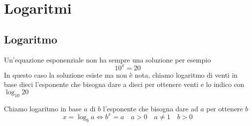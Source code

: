 \chapter{Logaritmi}
\label{sec:Logaritmi}
\minitoc
\mtcskip                                %
\minilof                                %
\mtcskip                                %
\minilot
\section{Logaritmo}
\label{sec:Lograritmo}
Un'equazione esponenziale non ha sempre una soluzione per esempio \[10^x=20\] In questo caso la soluzione esiste ma non è nota, chiamo logaritmo di venti in base dieci l'esponente che bisogna dare a dieci per ottenere venti e lo indico con $\log_{10}20$
\begin{definizione}
	Chiamo logaritmo in base $a$ di $b$ l'esponente che bisogna dare ad $a$ per ottenere $b$ \[x=\log_ba\Leftrightarrow b^{x}=a\quad a>0\quad a\neq  1\quad b>0 \]
\end{definizione} 
